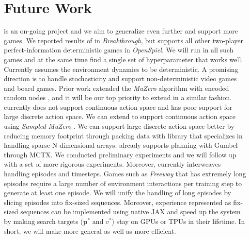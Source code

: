 \chapter{Future Work}
\moozi is an on-going project and we aim to generalize \moozi even further and support more games.
We reported results of \moozi in \textit{Breakthrough}, but \moozi supports all other two-player perfect-information deterministic games in \textit{OpenSpiel}.
We will run \moozi in all such games and at the same time find a single set of hyperparameter that works well.
Currently \moozi assumes the environment dynamics to be deterministic.
A promising direction is to handle stochasticity and support non-deterministic video games and board games.
Prior work extended the \textit{MuZero} algorithm with encoded random nodes \cite{VectorQuantizedModels_Ozair.Li.ea_2021,PLANNINGSTOCHASTICENVIRONMENTS_Antonoglou.Schrittwieser.ea_2022}, and it will be our top priority to extend \moozi in a similar fashion.
\moozi currently does not support continuous action space and has poor support for large discrete action space.
We can extend \moozi to support continuous action space using \textit{Sampled MuZero} \cite{LearningPlanningComplex_Hubert.Schrittwieser.ea_2021}.
We can support large discrete action space better by reducing memory footprint through packing data with library that specializes in handling sparse N-dimensional arrays.
\moozi already supports planning with Gumbel \cite{PolicyImprovementPlanning_Danihelka.Guez.ea_2022} through MCTX.
We conducted preliminary experiments and we will follow up with a set of more rigorous experiments.
Moreover, \moozi currently interweaves handling episodes and timesteps.
Games such as \textit{Freeway} that has extremely long episodes require a large number of environment interactions per training step to generate at least one episode.
We will unify the handling of long episodes by slicing episodes into fix-sized sequences.
Moreover, experience represented as fix-sized sequences can be implemented using native JAX and speed up the system by making search targets (\(\mathbf{p}^{*}\) and $v^{*}$) stay on GPUs or TPUs in their lifetime.
In short, we will make \moozi more general as well as more efficient.